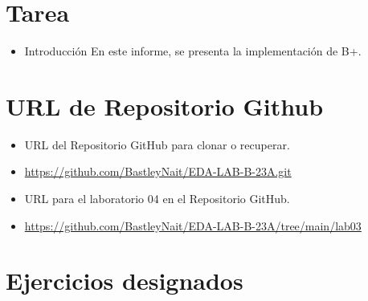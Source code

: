 \documentclass{article}
\begin{document}
	\section{Tarea}
	\begin{itemize}
		\item Introducción
En este informe, se presenta la implementación de B+.

	\end{itemize}	
		

	\section{URL de Repositorio Github}
	\begin{itemize}
		\item URL del Repositorio GitHub para clonar o recuperar.
		\item \url{https://github.com/BastleyNait/EDA-LAB-B-23A.git}
		\item URL para el laboratorio 04 en el Repositorio GitHub.
		\item \url{https://github.com/BastleyNait/EDA-LAB-B-23A/tree/main/lab03}
	\end{itemize}
	
	\section{Ejercicios designados}
\end{document}
